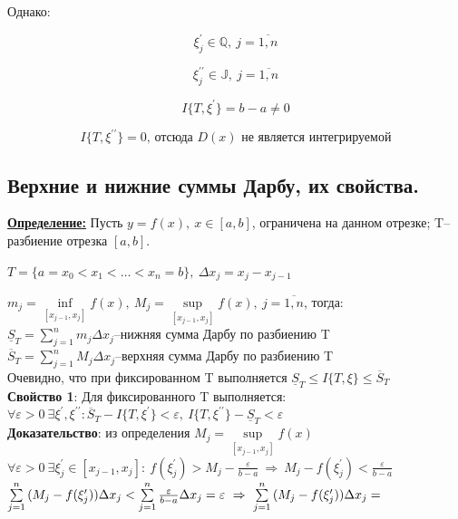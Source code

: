 \documentclass[a4paper,12pt]{article} %
\renewcommand {\leq}{\leqslant}
\begin{document}
	Однако:
	
	$$\xi_j^{\prime} \in \mathbb{Q},~j = \overline{1,n}$$
	
	$$\xi_j^{\prime \prime} \in \mathbb{J},~j = \overline{1,n}$$
	
	$$I\{T,\xi^{\prime}\} = b-a\neq 0$$
	
	$$I\{T,\xi^{\prime \prime}\} = 0 \text{, отсюда } D(x) \text{ не является интегрируемой}$$
	
	\subsection{Верхние и нижние суммы Дарбу, их свойства.}
	
	\underline{\textbf{Определение:}} Пусть $y = f(x),~x\in [a,b]$, ограничена на данном отрезке; T--разбиение отрезка $[a,b]$.
	
	$ T = \{a = x_0 < x_1 < {\dots} < x_n = b\},~\Delta x_j = x_j - x_{j-1} $
	
	$m_j = \inf\limits_{[x_{j-1},x_j]}f(x),~M_j = \sup\limits_{[x_{j-1},x_j]}f(x),~j = \overline{1,n}$, тогда:\\
	
	$\underline{S}_T = \sum\limits_{j = 1}^{n}{m_j \Delta x_j}$--нижняя сумма Дарбу по разбиению T\\
	
	$\overline{S}_T = \sum\limits_{j = 1}^{n}{M_j \Delta x_j}$--верхняя сумма Дарбу по разбиению T\\
	
	Очевидно, что при фиксированном T выполняется $\underline{S}_T \leq  I\{T,\xi\} \leq \overline{S}_T$\\
	
	\textbf{Свойство 1}: Для фиксированного T выполняется:\\
	$\forall\varepsilon>0~\exists \xi^{\prime}, \xi^{\prime \prime}: \overline{S}_T - I\{T,\xi^{\prime}\}<\varepsilon,~I\{T,\xi^{\prime\prime}\}-\underline{S}_T<\varepsilon$\\
	
	\textbf{Доказательство}: из определения $M_j = \sup\limits_{[x_{j-1},x_j]}f(x)$\\
	$\forall\varepsilon>0~\exists \xi^{\prime}_j \in [x_{j-1},x_j]:~f(\xi^{\prime}_j)>M_j-\frac{\varepsilon}{b-a}~\Rightarrow~M_j-f(\xi^{\prime}_j)<\frac{\varepsilon}{b-a}$\\
	
	$\sum\limits_{j = 1}^{n} {(M_j-f(\xi^{\prime}_j))\Delta x_j}<\sum\limits_{j = 1}^{n} {\frac{\varepsilon}{b-a}\Delta x_j} = \varepsilon~\Rightarrow~\sum\limits_{j = 1}^{n} {(M_j-f(\xi^{\prime}_j))\Delta x_j}=\\$
	
\end{document}
